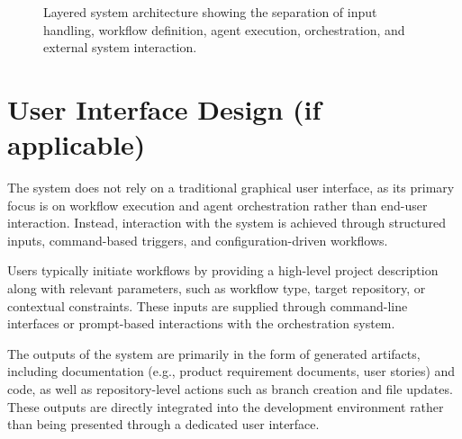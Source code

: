 \documentclass[a4paper,12pt]{report}
\begin{document}
\begin{figure}[h!]
\centering
{}
\caption{Layered system architecture showing the separation of input handling, workflow definition, agent execution, orchestration, and external system interaction.}
\label{fig:sysArch}
\end{figure}

\section{User Interface Design (if applicable)}
The system does not rely on a traditional graphical user interface, as its primary focus is on workflow execution and agent orchestration rather than end-user interaction. Instead, interaction with the system is achieved through structured inputs, command-based triggers, and configuration-driven workflows.

Users typically initiate workflows by providing a high-level project description along with relevant parameters, such as workflow type, target repository, or contextual constraints. These inputs are supplied through command-line interfaces or prompt-based interactions with the orchestration system.

The outputs of the system are primarily in the form of generated artifacts, including documentation (e.g., product requirement documents, user stories) and code, as well as repository-level actions such as branch creation and file updates. These outputs are directly integrated into the development environment rather than being presented through a dedicated user interface.
\end{document}
